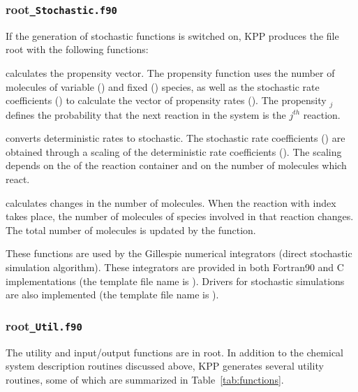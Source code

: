 \documentclass[twoside]{article}
\newcommand{\kpproot}{{\sc root}}
\begin{document}
\subsubsection{\kpproot{\tt\_Stochastic.f90}}
\label{sec:output-stochastic}

If the generation of stochastic functions is switched on, KPP produces
the file \kpproot{} with the following functions:

 calculates the propensity vector. The propensity
function uses the number of molecules of variable () and
fixed () species, as well as the stochastic rate
coefficients () to calculate the vector of propensity rates
(). The propensity $_j$ defines the
probability that the next reaction in the system is the $j^{th}$
reaction.

 converts deterministic rates to stochastic. The
stochastic rate coefficients () are obtained through a scaling
of the deterministic rate coefficients ().  The scaling depends
on the  of the reaction container and on the number of
molecules which react.

 calculates changes in the number of molecules.
When the reaction with index  takes place, the number of
molecules of species involved in that reaction changes. The total number
of molecules  is updated by the function.

These functions are used by the Gillespie numerical integrators (direct
stochastic simulation algorithm). These integrators are provided in both
Fortran90 and C implementations (the template file name is
). Drivers for stochastic simulations are also
implemented (the template file name is ).

\subsubsection{\kpproot{\tt\_Util.f90}}
\label{sec:output-utility}

The utility and input/output functions are in \kpproot{}.
In addition to the chemical system description routines discussed above,
KPP generates several utility routines, some of which are summarized in
Table~\ref{tab:functions}.
\end{document}
